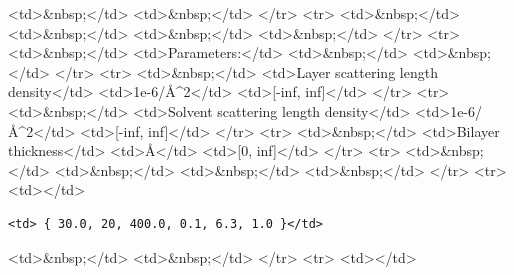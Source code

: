 \textless{}td\textgreater{}\&nbsp;\textless{}/td\textgreater{} \textless{}td\textgreater{}\&nbsp;\textless{}/td\textgreater{} \textless{}/tr\textgreater{} \textless{}tr\textgreater{} \textless{}td\textgreater{}\&nbsp;\textless{}/td\textgreater{} \textless{}td\textgreater{}\&nbsp;\textless{}/td\textgreater{} \textless{}td\textgreater{}\&nbsp;\textless{}/td\textgreater{} \textless{}td\textgreater{}\&nbsp;\textless{}/td\textgreater{} \textless{}/tr\textgreater{} \textless{}tr\textgreater{} \textless{}td\textgreater{}\&nbsp;\textless{}/td\textgreater{} \textless{}td\textgreater{}Parameters:\textless{}/td\textgreater{} \textless{}td\textgreater{}\&nbsp;\textless{}/td\textgreater{} \textless{}td\textgreater{}\&nbsp;\textless{}/td\textgreater{} \textless{}/tr\textgreater{} \textless{}tr\textgreater{} \textless{}td\textgreater{}\&nbsp;\textless{}/td\textgreater{} \textless{}td\textgreater{}Layer scattering length density\textless{}/td\textgreater{} \textless{}td\textgreater{}1e-6/\AA{}\textasciicircum{}2\textless{}/td\textgreater{} \textless{}td\textgreater{}[-inf, inf]\textless{}/td\textgreater{} \textless{}/tr\textgreater{} \textless{}tr\textgreater{} \textless{}td\textgreater{}\&nbsp;\textless{}/td\textgreater{} \textless{}td\textgreater{}Solvent scattering length density\textless{}/td\textgreater{} \textless{}td\textgreater{}1e-6/\AA{}\textasciicircum{}2\textless{}/td\textgreater{} \textless{}td\textgreater{}[-inf, inf]\textless{}/td\textgreater{} \textless{}/tr\textgreater{} \textless{}tr\textgreater{} \textless{}td\textgreater{}\&nbsp;\textless{}/td\textgreater{} \textless{}td\textgreater{}Bilayer thickness\textless{}/td\textgreater{} \textless{}td\textgreater{}\AA{}\textless{}/td\textgreater{} \textless{}td\textgreater{}[0, inf]\textless{}/td\textgreater{} \textless{}/tr\textgreater{} \textless{}tr\textgreater{} \textless{}td\textgreater{}\&nbsp;\textless{}/td\textgreater{} \textless{}td\textgreater{}\&nbsp;\textless{}/td\textgreater{} \textless{}td\textgreater{}\&nbsp;\textless{}/td\textgreater{} \textless{}td\textgreater{}\&nbsp;\textless{}/td\textgreater{} \textless{}/tr\textgreater{} \textless{}tr\textgreater{} \textless{}td\textgreater{}\textless{}/td\textgreater{}

\begin{verbatim}
<td> { 30.0, 20, 400.0, 0.1, 6.3, 1.0 }</td>
\end{verbatim}

\textless{}td\textgreater{}\&nbsp;\textless{}/td\textgreater{} \textless{}td\textgreater{}\&nbsp;\textless{}/td\textgreater{} \textless{}/tr\textgreater{} \textless{}tr\textgreater{} \textless{}td\textgreater{}\textless{}/td\textgreater{}

